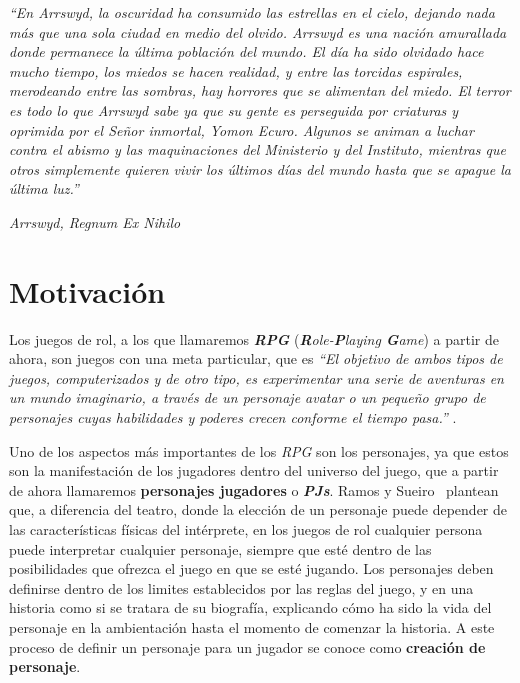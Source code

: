 

\vspace*{\fill}
\epigraph{\textit{“En Arrswyd, la oscuridad ha consumido las estrellas en el cielo, 
dejando nada más que una sola ciudad en medio del olvido. Arrswyd es una nación amurallada 
donde permanece la última población del mundo. El día ha sido olvidado hace mucho tiempo, 
los miedos se hacen realidad, y entre las torcidas espirales, merodeando entre las sombras, 
hay horrores que se alimentan del miedo. El terror es todo lo que Arrswyd sabe ya que su gente 
es perseguida por criaturas y oprimida por el Señor inmortal, Yomon Ecuro. Algunos se animan a 
luchar contra el abismo y las maquinaciones del Ministerio y del Instituto, mientras que otros 
simplemente quieren vivir los últimos días del mundo hasta que se apague la última luz.”}}{\textit{Arrswyd, Regnum Ex Nihilo}}
\vspace*{\fill}

\newpage

\section{Motivación} \label{Motivacion}
Los juegos de rol, a los que llamaremos \textbf{\textit{RPG}} (\textit{\textbf{R}ole-\textbf{P}laying \textbf{G}ame}) a 
partir de ahora, son juegos con una meta particular, que es \textit{“El objetivo de ambos tipos de juegos, computerizados y 
de otro tipo, es experimentar una serie de aventuras en un mundo imaginario, a través de un personaje avatar o un pequeño grupo de 
personajes cuyas habilidades y poderes crecen conforme el tiempo pasa.”} \autocite*{Adams2010}. \medskip

Uno de los aspectos más importantes de los \textit{RPG} son los personajes, ya que estos son la manifestación de los jugadores 
dentro del universo del juego, que a partir de ahora llamaremos \textbf{personajes jugadores} o \textbf{\textit{PJs}}. 
Ramos y Sueiro~\autocite*{Ramos-Villagrasa2010} plantean que, a diferencia del teatro, donde la elección de un personaje puede depender de las características 
físicas del intérprete, en los juegos de rol cualquier persona puede interpretar cualquier personaje, siempre que esté dentro de las 
posibilidades que ofrezca el juego en que se esté jugando. Los personajes deben definirse dentro de los limites establecidos por 
las reglas del juego, y en una historia como si se tratara de su biografía, explicando cómo ha sido la vida del personaje en 
la ambientación hasta el momento de comenzar la historia. A este proceso de definir un personaje 
para un jugador se conoce como \textbf{creación de personaje}. \medskip

